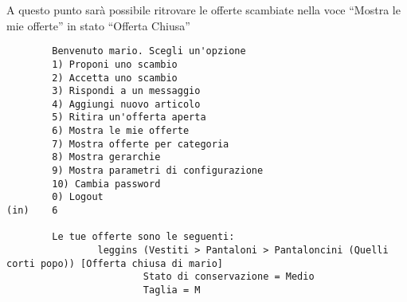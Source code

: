 A questo punto sarà possibile ritrovare le offerte scambiate nella voce ``Mostra le mie offerte'' in stato ``Offerta Chiusa''

\begin{lstlisting}
        Benvenuto mario. Scegli un'opzione
        1) Proponi uno scambio
        2) Accetta uno scambio
        3) Rispondi a un messaggio
        4) Aggiungi nuovo articolo
        5) Ritira un'offerta aperta
        6) Mostra le mie offerte
        7) Mostra offerte per categoria
        8) Mostra gerarchie
        9) Mostra parametri di configurazione
        10) Cambia password
        0) Logout
(in)    6

        Le tue offerte sono le seguenti: 
                leggins (Vestiti > Pantaloni > Pantaloncini (Quelli corti popo)) [Offerta chiusa di mario]
                        Stato di conservazione = Medio
                        Taglia = M
\end{lstlisting}
